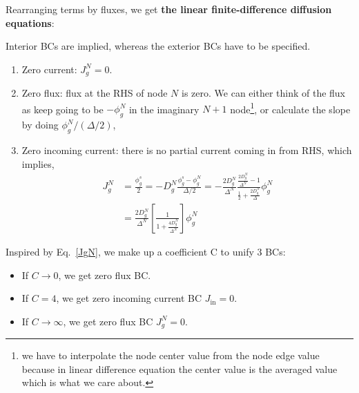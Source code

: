 \documentclass{school-22.211-notes}
\begin{document}
Rearranging terms by fluxes, we get \textbf{the linear finite-difference diffusion equations}:
\small
{} 
\normalsize

\clearpage
{}
Interior BCs are implied, whereas the exterior BCs have to be specified. 
\begin{enumerate}
\item Zero current: $J_g^N = 0$. 

\item Zero flux: flux at the RHS of node $N$ is zero.  We can either think of the flux as keep going to be $-\phi_g^N$ in the imaginary $N+1$ node\footnote{we have to interpolate the node center value from the node edge value because in linear difference equation the center value is the averaged value which is what we care about.}, or calculate the slope by doing $\phi_g^N / (\Delta /2)$,

\item Zero incoming current: there is no partial current coming in from RHS,
which implies,
\begin{align}
  J_g^N &= \frac{\phi_g^s}{2} = -D_g^N \frac{\phi_g^s - \phi_g^N}{\Delta/2} = - \frac{2 D_g^N}{\Delta^N} \frac{\frac{2D_g^N}{\Delta^N} - 1}{\frac{1}{2} + \frac{2D_g^N}{\Delta}} \phi_g^N \\
  &= \frac{2D_g^N}{\Delta^N} \left[ \frac{1}{1 + \frac{4 D_g^{N}}{\Delta^N}} \right] \phi_g^N  \label{JgN}
\end{align}
\end{enumerate}

Inspired by Eq.~\ref{JgN}, we make up a coefficient C to unify 3 BCs: 
\begin{itemize}
\item If $C \to 0$, we get zero flux BC.  
\item If $C = 4$, we get zero incoming current BC $J_{\mathrm{in}} = 0$.
\item If $C \to \infty$, we get zero flux BC $J_g^N = 0$. 
\end{itemize}
\end{document}
